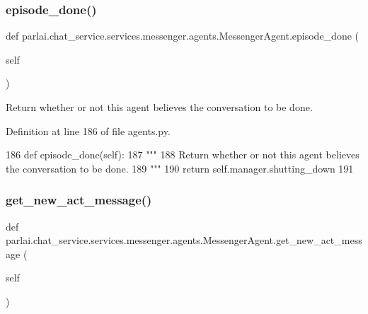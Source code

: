\subsubsection{\texorpdfstring{episode\+\_\+done()}{episode\_done()}}
{\footnotesize\ttfamily def parlai.\+chat\+\_\+service.\+services.\+messenger.\+agents.\+Messenger\+Agent.\+episode\+\_\+done (\begin{DoxyParamCaption}\item[{}]{self }\end{DoxyParamCaption})}

\begin{DoxyVerb}Return whether or not this agent believes the conversation to be done.
\end{DoxyVerb}
 

Definition at line 186 of file agents.\+py.


\begin{DoxyCode}
186     \textcolor{keyword}{def }episode\_done(self):
187         \textcolor{stringliteral}{"""}
188 \textcolor{stringliteral}{        Return whether or not this agent believes the conversation to be done.}
189 \textcolor{stringliteral}{        """}
190         \textcolor{keywordflow}{return} self.manager.shutting\_down
191 
\end{DoxyCode}
\mbox{\label{classparlai_1_1chat__service_1_1services_1_1messenger_1_1agents_1_1MessengerAgent_accb5cc3e4ed2214d6433a0c64cab54cb}} 
\subsubsection{\texorpdfstring{get\+\_\+new\+\_\+act\+\_\+message()}{get\_new\_act\_message()}}
{\footnotesize\ttfamily def parlai.\+chat\+\_\+service.\+services.\+messenger.\+agents.\+Messenger\+Agent.\+get\+\_\+new\+\_\+act\+\_\+message (\begin{DoxyParamCaption}\item[{}]{self }\end{DoxyParamCaption})}

